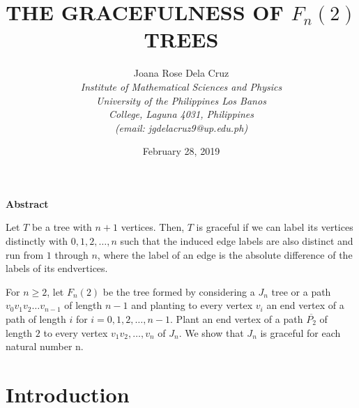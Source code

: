 \documentclass[a4paper, 11pt]{article}
\begin{document}
		\title{\textbf{THE GRACEFULNESS OF $F_{n}\left ( 2 \right )$ TREES}}
		\author{
		Joana Rose Dela Cruz\\
		\textit{Institute of Mathematical Sciences and Physics}\\
		\textit{University of the Philippines Los Banos}\\
		\textit{College, Laguna 4031, Philippines}	\\
		\textit{(email: jgdelacruz9@up.edu.ph)}	}
		\date{February 28, 2019}
	\maketitle
	
	\begin{center}
		\textbf{Abstract}
	\end{center}
\noindent 
\noindent Let $T$ be a tree with $n + 1$ vertices. Then, $T$ is graceful if we can label its vertices distinctly with $0,1,2,\ldots,n$ such that the induced edge labels are also distinct and run from $1$ through $n$, where the label of an edge is the absolute diﬀerence of the labels of its endvertices. \par 

For $n\geq2$, let  $F_{n}\left ( 2 \right )$ be the tree formed by considering a $J_{n}$ tree or a path $v_{0}v_{1}v_{2}\ldots v_{n-1}$ of length $n−1$ and planting to every vertex $v_{i}$ an end vertex of a path of length $i$ for
$i = 0,1,2,\ldots,n−1$. Plant an end vertex of a path $\overline{P_{2}}$ of length $2$ to every vertex $v_{1}v_{2},\ldots,v_{n}$ of $J_{n}$. We show that $J_{n}$ is graceful for each natural number n.

\section{Introduction}
\end{document}
